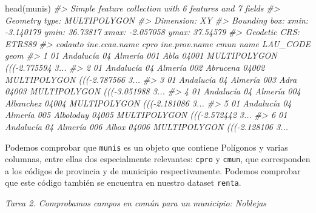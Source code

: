 \documentclass[
]{book}
\newenvironment{Shaded}{\begin{snugshade}}{\end{snugshade}}
\newcommand{\CommentTok}[1]{\textcolor[rgb]{0.56,0.35,0.01}{\textit{#1}}}
\newcommand{\FunctionTok}[1]{\textcolor[rgb]{0.00,0.00,0.00}{#1}}
\newcommand{\NormalTok}[1]{#1}
\begin{document}
\begin{Shaded}
\begin{Highlighting}[]
\FunctionTok{head}\NormalTok{(munis)}
\CommentTok{\#\textgreater{} Simple feature collection with 6 features and 7 fields}
\CommentTok{\#\textgreater{} Geometry type: MULTIPOLYGON}
\CommentTok{\#\textgreater{} Dimension:     XY}
\CommentTok{\#\textgreater{} Bounding box:  xmin: {-}3.140179 ymin: 36.73817 xmax: {-}2.057058 ymax: 37.54579}
\CommentTok{\#\textgreater{} Geodetic CRS:  ETRS89}
\CommentTok{\#\textgreater{}   codauto ine.ccaa.name cpro ine.prov.name cmun      name LAU\_CODE                           geom}
\CommentTok{\#\textgreater{} 1      01     Andalucía   04       Almería  001      Abla    04001 MULTIPOLYGON ((({-}2.775594 3...}
\CommentTok{\#\textgreater{} 2      01     Andalucía   04       Almería  002  Abrucena    04002 MULTIPOLYGON ((({-}2.787566 3...}
\CommentTok{\#\textgreater{} 3      01     Andalucía   04       Almería  003      Adra    04003 MULTIPOLYGON ((({-}3.051988 3...}
\CommentTok{\#\textgreater{} 4      01     Andalucía   04       Almería  004 Albanchez    04004 MULTIPOLYGON ((({-}2.181086 3...}
\CommentTok{\#\textgreater{} 5      01     Andalucía   04       Almería  005 Alboloduy    04005 MULTIPOLYGON ((({-}2.572442 3...}
\CommentTok{\#\textgreater{} 6      01     Andalucía   04       Almería  006     Albox    04006 MULTIPOLYGON ((({-}2.128106 3...}
\end{Highlighting}
\end{Shaded}

Podemos comprobar que \texttt{munis} es un objeto que contiene Polígonos y varias
columnas, entre ellas dos especialmente relevantes: \texttt{cpro} y \texttt{cmun}, que
corresponden a los códigos de provincia y de municipio respectivamente. Podemos
comprobar que este código también se encuentra en nuestro dataset \texttt{renta}.

\emph{Tarea 2. Comprobamos campos en común para un municipio: Noblejas}
\end{document}
